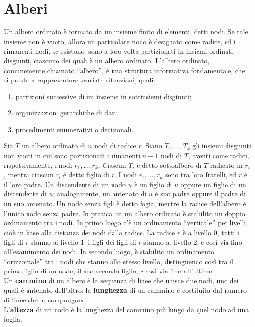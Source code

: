 \documentclass[12pt]{report}
\begin{document}
	\chapter{Alberi}
	Un albero ordinato è formato da un insieme finito di elementi, detti nodi. Se tale insieme non è vuoto, allora un particolare nodo è designato come radice, ed i rimanenti nodi, se esistono, sono a loro volta partizionati in insiemi ordinati disgiunti, ciascuno dei quali è un albero ordinato. L'albero ordinato, comunemente chiamato ``albero'', è una struttura informativa fondamentale, che si presta a rappresentare svariate situazioni, quali:
	\begin{enumerate}
		\item partizioni successive di un insieme in sottinsiemi disgiunti;
		\item organizzazioni gerarchiche di dati;
		\item procedimenti enumerativi o decisionali.
	\end{enumerate}
	Sia $T$ un albero ordinato di $n$ nodi di radice $r$. Siano $T_1, \dots, T_k$ gli insiemi disgiunti non vuoti in cui sono partizionati i rimanenti $n - 1$ nodi di $T$, aventi come radici, rispettivamente, i nodi $r_1, \dots, r_k$. Ciascun $T_i$ è detto sottoalbero di $T$ radicato in $r_i$, mentra ciascun $r_i$ è detto figlio di $r$. I nodi $r_1, \dots, r_k$ sono tra loro fratelli, ed $r$ è il loro padre. Un discendente di un nodo $u$ è un figlio di $u$ oppure un figlio di un discendente di $u$; analogamente, un antenato di $u$ è suo padre oppure il padre di un suo antenato. Un nodo senza figli è detto fogia, mentre la radice dell'albero è l'unico nodo senza padre. In pratica, in un albero ordinato è stabilito un doppio ordinamento tra i nodi. In primo luogo c'è un ordinamento ``verticale'' per livelli, cioè in base alla distanza dei nodi dalla radice. La radice $r$ è a livello 0, tutti i figli di $r$ stanno al livello 1, i figli dei figli di $r$ stanno al livello 2, e così via fino all'esaurimento dei nodi. In secondo luogo, è stabilito un ordinamento ``orizzontale'' tra i nodi che stanno allo stesso livello, distinguendo così tra il primo figlio di un nodo, il suo secondo figlio, e così via fino all'ultimo. \\
	Un \textbf{cammino} di un albero è la sequenza di linee che unisce due nodi, uno dei quali è antenato dell'altro; la \textbf{lunghezza} di un cammino è costituita dal numero di linee che lo compongono. \\
	L'\textbf{altezza} di un nodo è la lunghezza del cammino più lungo da quel nodo ad una foglia. \\
\end{document}
